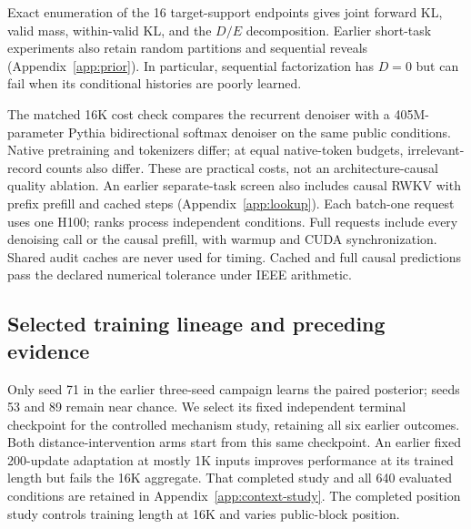 \documentclass{article}
\begin{document}
Exact enumeration of the 16 target-support endpoints gives joint forward KL,
valid mass, within-valid KL, and the $D/E$ decomposition. Earlier short-task
experiments also retain random partitions and sequential reveals
(Appendix~\ref{app:prior}). In particular, sequential factorization has $D=0$
but can fail when its conditional histories are poorly learned.

The matched 16K cost check compares the recurrent denoiser with a
405M-parameter Pythia bidirectional softmax denoiser on the same public
conditions. Native pretraining and tokenizers differ; at equal native-token
budgets, irrelevant-record counts also differ. These are practical costs,
not an architecture-causal quality ablation. An earlier separate-task screen
also includes causal RWKV with prefix prefill and cached steps
(Appendix~\ref{app:lookup}). Each batch-one request uses one H100; ranks
process independent conditions. Full requests include every
denoising call or the causal prefill, with warmup and CUDA synchronization.
Shared audit caches are never used for timing. Cached and full causal
predictions pass the declared numerical tolerance under IEEE arithmetic.

\subsection{Selected training lineage and preceding evidence}
Only seed 71 in the earlier three-seed campaign learns the paired posterior;
seeds 53 and 89 remain near chance. We select its fixed independent terminal
checkpoint for the controlled mechanism study, retaining all six earlier
outcomes. Both distance-intervention arms start from this same checkpoint.
An earlier fixed 200-update adaptation at mostly 1K inputs improves performance
at its trained length but fails the 16K aggregate. That completed study and all
640 evaluated conditions are retained in Appendix~\ref{app:context-study}.
The completed position study controls training length at 16K and varies public-block position.









\end{document}
